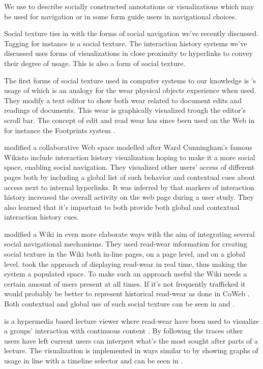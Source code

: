 We use  to describe socially constructed annotations or
visualizations which may be used for navigation or in some form guide
users in navigational choices.

Social texture ties in with the forms of social navigation we've
recently discussed. Tagging for instance is a social texture.
The interaction history systems we've discussed uses forms of visualizations
in close proximity to hyperlinks to convey their degree of usage. This is also
a form of social texture.

The first forms of social texture used in computer systems to our knowledge is
\citet{hill92}'s usage of  which is an analogy for
the wear physical objects experience when used. They modify a text editor to
show both wear related to document edits and readings of documents. This wear
is graphically visualized trough the editor's scroll bar.
The concept of edit and read wear has since been used on the Web in for
instance the Footprints system \citep{wexelblat99}.

\citet{dieberger00a} modified \dash{}a collaborative Web space
modelled after Ward Cunningham's famous Wikis\dash{}to include interaction
history visualization hoping to make it a more social space, enabling social
navigation. They visualized other users' access of different pages both by
including a global list of such behavior and contextual cues about access
next to internal hyperlinks.
It was inferred by \citeauthor{dieberger00a} that markers of interaction
history increased the overall activity on the web page during a user study.
They also learned that it's important to both provide both global and
contextual interaction history cues.

\citet{xu06} modified a Wiki in even more elaborate ways
with the aim of integrating several social navigational mechanisms.
They used read-wear information for creating social
texture in the Wiki both in-line pages, on a page level, and on a global
level. \citeauthor{xu06} took the approach of displaying read-wear in real
time, thus making the system a populated space. To make such an approach
useful the Wiki needs a certain amount of users present at all times. If
it's not frequently trafficked it would probably be better to represent
historical read-wear as done in CoWeb \citep[p.~220]{dieberger00a}. Both
contextual and global use of such social texture can be seen in
 and .

 is a hypermedia based lecture viewer where read-wear
have been used to visualize a groups' interaction with continuous content
\citep{mertens06}. By following the traces other users have left current users
can interpret what's the most sought after parts of a lecture. The
visualization is implemented in ways similar to \citet{hill92} by showing
graphs of usage in line with a timeline selector and can be seen in
.

